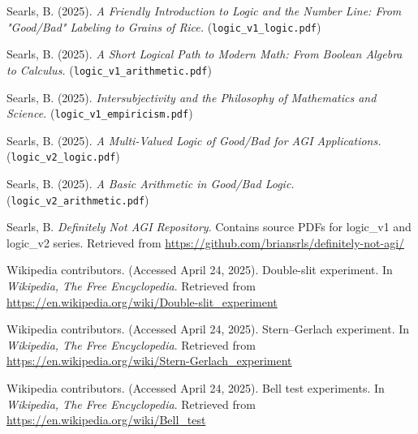 \documentclass{article}
\begin{document}
\begin{thebibliography}{9} %

 Searls, B. (2025). \textit{A Friendly Introduction to Logic and the Number Line: From "Good/Bad" Labeling to Grains of Rice.} (\texttt{logic\_v1\_logic.pdf})

 Searls, B. (2025). \textit{A Short Logical Path to Modern Math: From Boolean Algebra to Calculus.} (\texttt{logic\_v1\_arithmetic.pdf})

 Searls, B. (2025). \textit{Intersubjectivity and the Philosophy of Mathematics and Science.} (\texttt{logic\_v1\_empiricism.pdf})

 Searls, B. (2025). \textit{A Multi-Valued Logic of Good/Bad for AGI Applications.} (\texttt{logic\_v2\_logic.pdf})

 Searls, B. (2025). \textit{A Basic Arithmetic in Good/Bad Logic.} (\texttt{logic\_v2\_arithmetic.pdf})

 Searls, B. \textit{Definitely Not AGI Repository}. Contains source PDFs for logic\_v1 and logic\_v2 series. Retrieved from \url{https://github.com/briansrls/definitely-not-agi/}

 Wikipedia contributors. (Accessed April 24, 2025). Double-slit experiment. In \textit{Wikipedia, The Free Encyclopedia}. Retrieved from \url{https://en.wikipedia.org/wiki/Double-slit_experiment}

 Wikipedia contributors. (Accessed April 24, 2025). Stern–Gerlach experiment. In \textit{Wikipedia, The Free Encyclopedia}. Retrieved from \url{https://en.wikipedia.org/wiki/Stern-Gerlach_experiment}

 Wikipedia contributors. (Accessed April 24, 2025). Bell test experiments. In \textit{Wikipedia, The Free Encyclopedia}. Retrieved from \url{https://en.wikipedia.org/wiki/Bell_test}

\end{thebibliography}
\end{document}
